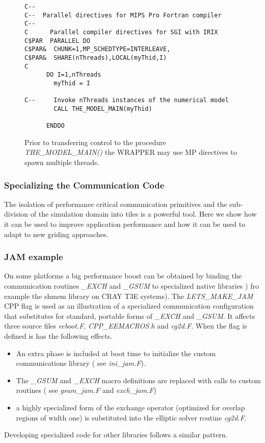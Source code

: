 \begin{figure}
\begin{verbatim}
C--
C--  Parallel directives for MIPS Pro Fortran compiler
C--
C      Parallel compiler directives for SGI with IRIX
C$PAR  PARALLEL DO
C$PAR&  CHUNK=1,MP_SCHEDTYPE=INTERLEAVE,
C$PAR&  SHARE(nThreads),LOCAL(myThid,I)
C
      DO I=1,nThreads
        myThid = I

C--     Invoke nThreads instances of the numerical model
        CALL THE_MODEL_MAIN(myThid)

      ENDDO
\end{verbatim}
\caption{Prior to transferring control to
the procedure {\em THE\_MODEL\_MAIN()} the WRAPPER may use
MP directives to spawn multiple threads.
} \label{fig:mp_directives}
\end{figure}


\subsubsection{Specializing the Communication Code}

The isolation of performance critical communication primitives and the
sub-division of the simulation domain into tiles is a powerful tool.
Here we show how it can be used to improve application performance and
how it can be used to adapt to new griding approaches.

\subsubsection{JAM example}
\label{sect:jam_example}
On some platforms a big performance boost can be obtained by
binding the communication routines {\em \_EXCH} and
{\em \_GSUM} to specialized native libraries ) fro example the
shmem library on CRAY T3E systems). The {\em LETS\_MAKE\_JAM} CPP flag 
is used as an illustration of a specialized communication configuration 
that substitutes for standard, portable forms of {\em \_EXCH} and 
{\em \_GSUM}. It affects three source files {\em eeboot.F}, 
{\em CPP\_EEMACROS.h} and {\em cg2d.F}. When the flag is defined
is has the following effects.
\begin{itemize}
\item An extra phase is included at boot time to initialize the custom 
communications library ( see {\em ini\_jam.F}).
\item The {\em \_GSUM} and {\em \_EXCH} macro definitions are replaced
with calls to custom routines ( see {\em gsum\_jam.F} and {\em exch\_jam.F})
\item a highly specialized form of the exchange operator (optimized
for overlap regions of width one) is substituted into the elliptic
solver routine {\em cg2d.F}.
\end{itemize}
Developing specialized code for other libraries follows a similar
pattern.

